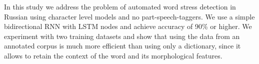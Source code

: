 In this study we address the problem of automated word stress detection in Russian using character level models and no part-speech-taggers. We use a simple bidirectional RNN with LSTM nodes and achieve accuracy of 90\% or higher. We experiment with two training datasets and show that using the data from an annotated corpus is much more efficient than using only a dictionary, since it allows to retain the context of the word and its morphological features.
